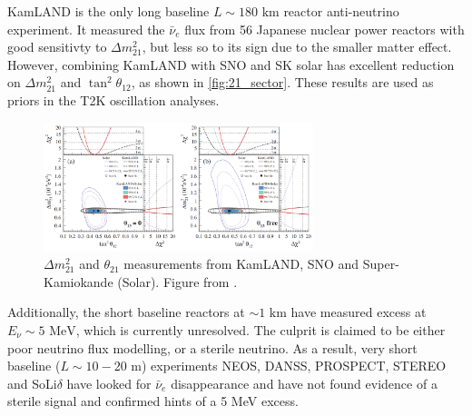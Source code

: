 KamLAND is the only long baseline $L\sim180\text{ km}$ reactor anti-neutrino experiment. It measured the $\bar{\nu}_e$ flux from 56 Japanese nuclear power reactors with good sensitivty to $\Delta m^2_{21}$, but less so to its sign due to the smaller matter effect. However, combining KamLAND with SNO and SK solar has excellent reduction on $\Delta m^2_{21}$ and $\tan^2\theta_{12}$, as shown in \autoref{fig:21_sector}. These results are used as priors in the T2K oscillation analyses.
\begin{figure}[h]
	\includegraphics[width=0.7\textwidth, trim={0mm 0mm 0mm 0mm}, clip,page=1]{figures/theory/kamland_solar_comb}
	\caption{$\Delta m^2_{21}$ and $\theta_{21}$ measurements from KamLAND, SNO and Super-Kamiokande (Solar). Figure from \cite{kamland_2011}.}
	\label{fig:21_sector}
\end{figure}

Additionally, the short baseline reactors at $\sim1\text{ km}$ have measured excess at $E_\nu\sim5\text{ MeV}$\cite{double_chooz, daya_bay, reno}, which is currently unresolved. The culprit is claimed to be either poor neutrino flux modelling, or a sterile neutrino\cite{huber_neos,steriles}. As a result, very short baseline ($L\sim10-20\text{ m}$) experiments NEOS\cite{neos}, DANSS\cite{danss}, PROSPECT\cite{prospect}, STEREO\cite{stereo} and SoLi$\delta$\cite{solid} have looked for $\bar{\nu}_e$ disappearance and have not found evidence of a sterile signal and confirmed hints of a 5 MeV excess.